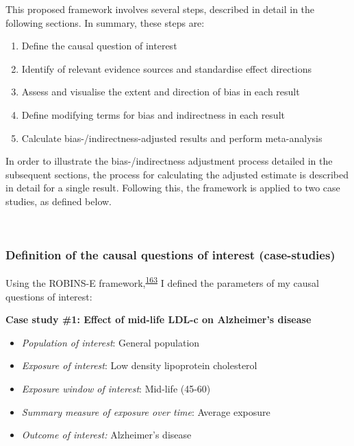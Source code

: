 \documentclass[a4paper, twoside]{templates/ociamthesis}
\providecommand{\tightlist}{%
  \setlength{\itemsep}{0pt}\setlength{\parskip}{0pt}}
\begin{document}
This proposed framework involves several steps, described in detail in the following sections. In summary, these steps are:

\begin{enumerate}
\def\labelenumi{\arabic{enumi}.}
\tightlist
\item
  Define the causal question of interest
\item
  Identify of relevant evidence sources and standardise effect directions
\item
  Assess and visualise the extent and direction of bias in each result
\item
  Define modifying terms for bias and indirectness in each result
\item
  Calculate bias-/indirectness-adjusted results and perform meta-analysis
\end{enumerate}

In order to illustrate the bias-/indirectness adjustment process detailed in the subsequent sections, the process for calculating the adjusted estimate is described in detail for a single result. Following this, the framework is applied to two case studies, as defined below.

~

\hypertarget{definition-of-the-causal-questions-of-interest-case-studies}{%
\subsubsection{Definition of the causal questions of interest (case-studies)}\label{definition-of-the-causal-questions-of-interest-case-studies}}

Using the ROBINS-E framework,\textsuperscript{\protect\hyperlink{ref-morganr2020}{163}} I defined the parameters of my causal questions of interest:

\textbf{Case study \#1: Effect of mid-life LDL-c on Alzheimer's disease}

\begin{itemize}
\tightlist
\item
  \emph{Population of interest}: General population
\item
  \emph{Exposure of interest}: Low density lipoprotein cholesterol
\item
  \emph{Exposure window of interest}: Mid-life (45-60)
\item
  \emph{Summary measure of exposure over time}: Average exposure
\item
  \emph{Outcome of interest:} Alzheimer's disease
\end{itemize}
\end{document}
